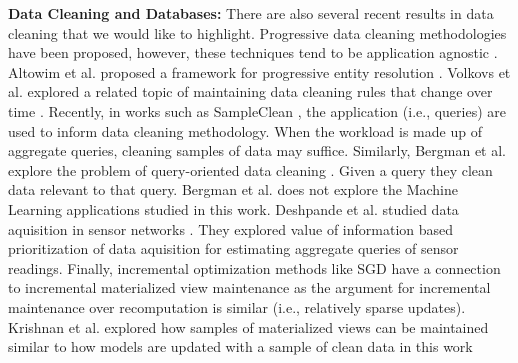 \noindent \textbf{Data Cleaning and Databases: } There are also several recent results in data cleaning that we would like to highlight. 
Progressive data cleaning methodologies have been proposed, however, these techniques tend to be application agnostic \cite{mayfield2010eracer}.
Altowim et al. proposed a framework for progressive entity resolution \cite{altowim2014progressive}. 
Volkovs et al. explored a related topic of maintaining data cleaning rules that change over time \cite{volkovs2014continuous}. 
Recently, in works such as SampleClean \cite{wang1999sample}, the application (i.e., queries) are used to inform data cleaning methodology.
When the workload is made up of aggregate queries, cleaning samples of data may suffice. 
Similarly, Bergman et al. explore the problem of query-oriented data cleaning \cite{bergman2015query}. Given a query they clean data relevant to that query. 
Bergman et al. does not explore the Machine Learning applications studied in this work.
Deshpande et al. studied data aquisition in sensor networks \cite{deshpande2004model}. They explored value of information based prioritization of data aquisition for estimating aggregate queries of sensor readings.
Finally, incremental optimization methods like SGD have a connection to incremental materialized view maintenance as the argument for incremental maintenance over recomputation is similar (i.e., relatively sparse updates).
Krishnan et al. explored how samples of materialized views can be maintained similar to how models are updated with a sample of clean data in this work \cite{krishnan2015svc}




